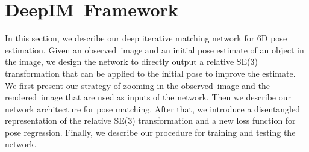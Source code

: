\documentclass[twocolumn]{svjour3}
\newcommand{\TODO}[1]{\textcolor{red}{TODO:#1}}
\newcommand{\old}[1]{\textcolor{blue}{Old:#1}}
\newcommand{\new}[1]{\textcolor{red}{New:#1}}
\newcommand{\dimnet}[0]{DeepIM}
\newcommand{\xreal}[0]{\mathbf{img}_{\text{obs}}}
\newcommand{\xrend}[0]{\mathbf{img}_{\text{rend}}}
\newcommand{\rend}[0]{rendered}
\newcommand{\real}[0]{observed}
\newcommand{\pose}[0]{\mathbf{p}}
\newcommand{\dpose}[0]{\mathbf{\Delta{p}}}
\newcommand{\ddd}[1]{\textcolor{red}{Dieter:#1}}
\begin{document}

\section{\dimnet\ Framework}



In this section, we describe our deep iterative matching network for 6D pose estimation. Given an \real\ image and an initial pose estimate of an object in the image, we design the network to directly output a relative SE(3) transformation that can be applied to the initial pose to improve the estimate. We first present our strategy of zooming in the \real\ image and the \rend\ image that are used as inputs of the network. Then we describe our network architecture for pose matching. After that, we introduce a disentangled representation of the relative SE(3) transformation and a new loss function for pose regression. Finally, we describe our procedure for training and testing the network.


\end{document}
